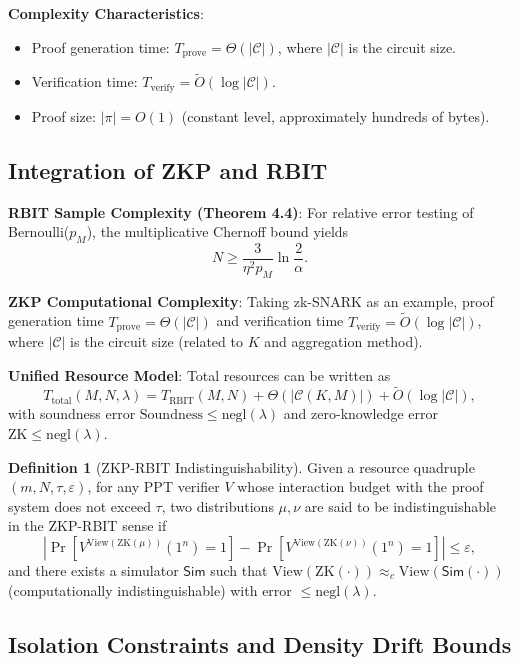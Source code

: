 \documentclass[12pt]{article}
\theoremstyle{plain}
\theoremstyle{definition}
\newtheorem{definition}[theorem]{Definition}
\begin{document}
\textbf{Complexity Characteristics}:
\begin{itemize}
\item Proof generation time: $T_{\text{prove}} = \Theta(|\mathcal{C}|)$, where $|\mathcal{C}|$ is the circuit size.
\item Verification time: $T_{\text{verify}} = \tilde{O}(\log |\mathcal{C}|)$.
\item Proof size: $|\pi| = O(1)$ (constant level, approximately hundreds of bytes).
\end{itemize}

\subsection{Integration of ZKP and RBIT}

\textbf{RBIT Sample Complexity (Theorem 4.4)}: For relative error testing of Bernoulli($p_M$), the multiplicative Chernoff bound\cite{chernoff1952} yields
\[
N \ge \frac{3}{\eta^2 p_M} \ln \frac{2}{\alpha}.
\]

\textbf{ZKP Computational Complexity}: Taking zk-SNARK as an example, proof generation time $T_{\text{prove}} = \Theta(|\mathcal{C}|)$ and verification time $T_{\text{verify}} = \tilde{O}(\log |\mathcal{C}|)$, where $|\mathcal{C}|$ is the circuit size (related to $K$ and aggregation method).

\textbf{Unified Resource Model}: Total resources can be written as
\[
T_{\text{total}}(M, N, \lambda) = T_{\text{RBIT}}(M, N) + \Theta(|\mathcal{C}(K, M)|) + \tilde{O}(\log |\mathcal{C}|),
\]
with soundness error $\text{Soundness} \le \text{negl}(\lambda)$ and zero-knowledge error $\text{ZK} \le \text{negl}(\lambda)$.

\begin{definition}[ZKP-RBIT Indistinguishability]
Given a resource quadruple $(m, N, \tau, \varepsilon)$, for any PPT verifier $V$ whose interaction budget with the proof system does not exceed $\tau$, two distributions $\mu, \nu$ are said to be indistinguishable in the ZKP-RBIT sense if
\[
\left|\Pr[V^{\text{View}(\text{ZK}(\mu))}(1^n)=1] - \Pr[V^{\text{View}(\text{ZK}(\nu))}(1^n)=1]\right| \le \varepsilon,
\]
and there exists a simulator $\mathsf{Sim}$ such that $\text{View}(\text{ZK}(\cdot)) \approx_c \text{View}(\mathsf{Sim}(\cdot))$ (computationally indistinguishable) with error $\le \text{negl}(\lambda)$.
\end{definition}

\subsection{Isolation Constraints and Density Drift Bounds}
\end{document}
